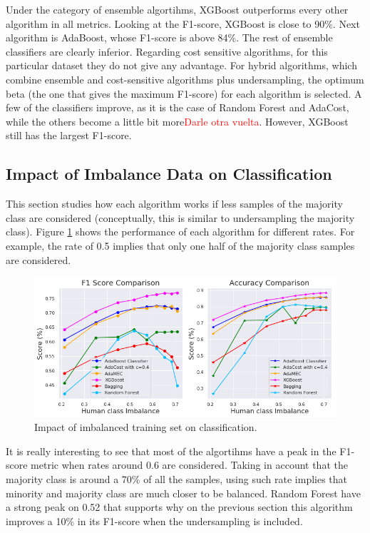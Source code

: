 \documentclass[conference]{IEEEtran}
\begin{document}
Under the category of ensemble algortihms, XGBoost outperforms every other algorithm in all metrics. Looking at the F1-score, XGBoost is close to 90\%. Next algorithm is AdaBoost, whose F1-score is above 84\%. The rest of ensemble classifiers are clearly inferior. Regarding cost sensitive algorithms, for this particular dataset they do not give any advantage. For hybrid algorithms, which combine ensemble and cost-sensitive algorithms plus undersampling, the optimum beta (the one that gives the maximum F1-score) for each algorithm is selected. A few of the classifiers improve, as it is the case of Random Forest and AdaCost, while the others become a little bit more\textcolor{red}{Darle otra vuelta}. However, XGBoost still has the largest F1-score.

\subsection{Impact of Imbalance Data on Classification}

This section studies how each algorithm works if less samples of the majority class are considered (conceptually, this is similar to undersampling the majority class). Figure \ref{Fig:ImbalanceComparison} shows the performance of each algorithm for different rates. For example, the rate of 0.5 implies that only one half of the majority class samples are considered.

\begin{figure}[htbp]
\centerline{\includegraphics[scale=0.35]{pictures/Imbalance_Comparison.png}}
\caption{Impact of imbalanced training set on classification.}
\label{Fig:ImbalanceComparison}
\end{figure}

It is really interesting to see that most of the algortihms have a peak in the F1-score metric when rates around 0.6 are considered. Taking in account that the majority class is around a 70\% of all the samples, using such rate implies that minority and majority class are much closer to be balanced. Random Forest have a strong peak on 0.52 that supports why on the previous section this algorithm improves a 10\% in its F1-score when the undersampling is included. 
\end{document}
